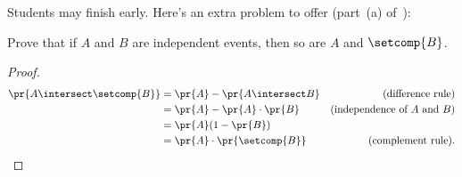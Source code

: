 \documentclass[handout]{mcs}
\begin{document}



\begin{staffnotes}
Students may finish early.  Here's an extra problem to offer
(part~(a) of~):

Prove that if $A$ and $B$ are independent events, then so are
$A$ and $\setcomp{B}$.
\begin{solution}
\begin{proof}
\begin{align*}
\pr{A \intersect \setcomp{B}}
  &  = \pr{A} - \pr{A \intersect B}
       & \text{(difference rule)}\\
  & =  \pr{A} - \pr{A} \cdot \pr{B}
       & \text{(independence of $A$ and $B$)}\\
  & =  \pr{A} (1 - \pr{B})\\
  & =  \pr{A} \cdot \pr{\setcomp{B}} & \text{(complement rule)}.
\end{align*}
\end{proof}
\end{solution}

\end{staffnotes}
\end{document}
